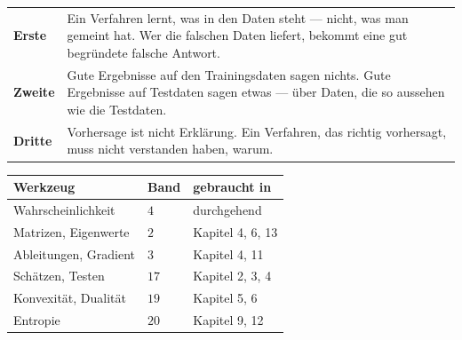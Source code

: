 \begin{warnung}
\begin{center}
{\small
\renewcommand{\arraystretch}{1.55}
\begin{tabular}{@{}P{2.2cm}P{6.4cm}@{}}
\toprule
\textbf{Erste} & Ein Verfahren lernt, was in den Daten steht --- nicht, was man gemeint hat. Wer die falschen Daten liefert, bekommt eine gut begründete falsche Antwort.\\
\textbf{Zweite} & Gute Ergebnisse auf den Trainingsdaten sagen nichts. Gute Ergebnisse auf Testdaten sagen etwas --- über Daten, die so aussehen wie die Testdaten.\\
\textbf{Dritte} & Vorhersage ist nicht Erklärung. Ein Verfahren, das richtig vorhersagt, muss nicht verstanden haben, warum.\\
\bottomrule
\end{tabular}}
\end{center}

\begin{center}
\begin{minipage}{0.88\textwidth}
\end{minipage}
\end{center}
\end{warnung}

\begin{merksatz}
\begin{center}
{\small
\renewcommand{\arraystretch}{1.48}
\begin{tabular}{@{}P{3.0cm}P{1.6cm}P{3.0cm}@{}}
\toprule
\textbf{Werkzeug} & \textbf{Band} & \textbf{gebraucht in}\\
\midrule
Wahrscheinlichkeit & $4$ & durchgehend\\
Matrizen, Eigenwerte & $2$ & Kapitel 4, 6, 13\\
Ableitungen, Gradient & $3$ & Kapitel 4, 11\\
Schätzen, Testen & $17$ & Kapitel 2, 3, 4\\
Konvexität, Dualität & $19$ & Kapitel 5, 6\\
Entropie & $20$ & Kapitel 9, 12\\
\bottomrule
\end{tabular}}
\end{center}

\begin{center}
\begin{minipage}{0.88\textwidth}
\end{minipage}
\end{center}
\end{merksatz}
